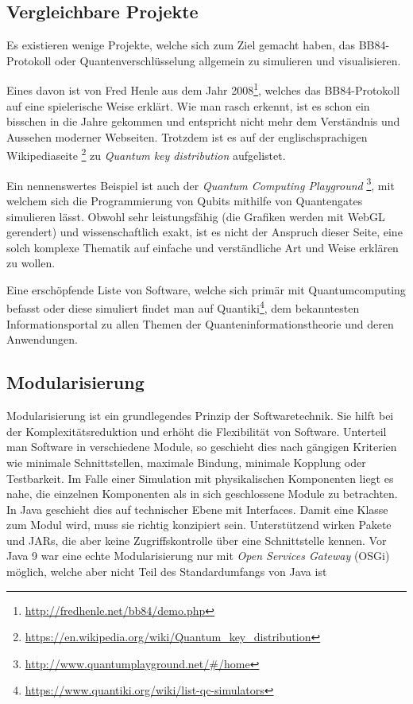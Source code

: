 \documentclass[a4paper,10.2pt,pdftex]{scrartcl}%
\begin{document}
\subsection{Vergleichbare Projekte}
Es existieren wenige Projekte, welche sich zum Ziel gemacht haben, das BB84-Protokoll oder Quantenverschlüsselung allgemein zu simulieren und visualisieren. 

Eines davon ist von Fred Henle aus dem Jahr 2008\footnote{\url{http://fredhenle.net/bb84/demo.php}}, welches das BB84-Protokoll auf eine spielerische Weise erklärt. Wie man rasch erkennt, ist es schon ein bisschen in die Jahre gekommen und entspricht nicht mehr dem Verständnis und Aussehen moderner Webseiten. Trotzdem ist es auf der englischsprachigen Wikipediaseite \footnote{\url{https://en.wikipedia.org/wiki/Quantum_key_distribution}} zu \emph{Quantum key distribution} aufgelistet.

Ein nennenswertes Beispiel ist auch der \emph{Quantum Computing Playground} \footnote{\url{http://www.quantumplayground.net/\#/home}}, mit welchem sich die Programmierung von Qubits mithilfe von Quantengates simulieren lässt. Obwohl sehr leistungsfähig (die Grafiken werden mit WebGL gerendert) und wissenschaftlich exakt, ist es nicht der Anspruch dieser Seite, eine solch komplexe Thematik auf einfache und verständliche Art und Weise erklären zu wollen.

Eine erschöpfende Liste von Software, welche sich primär mit Quantumcomputing befasst oder diese simuliert findet man auf Quantiki\footnote{\url{https://www.quantiki.org/wiki/list-qc-simulators}}, dem bekanntesten Informationsportal zu allen Themen der Quanteninformationstheorie und deren Anwendungen.

\subsection{Modularisierung}
Modularisierung ist ein grundlegendes Prinzip der Softwaretechnik. Sie hilft bei der Komplexitätsreduktion und erhöht die Flexibilität von Software. Unterteil man Software in verschiedene Module, so geschieht dies nach gängigen Kriterien wie minimale Schnittstellen, maximale Bindung, minimale Kopplung oder Testbarkeit. Im Falle einer Simulation mit physikalischen Komponenten liegt es nahe, die einzelnen Komponenten als in sich geschlossene Module zu betrachten. In Java geschieht dies auf technischer Ebene mit Interfaces. Damit eine Klasse zum Modul wird, muss sie richtig konzipiert sein. Unterstützend wirken Pakete und JARs, die aber keine Zugriffskontrolle über eine Schnittstelle kennen. Vor Java 9 war eine echte Modularisierung nur mit \emph{Open Services Gateway} (OSGi) möglich, welche aber nicht Teil des Standardumfangs von Java ist \cite[S. 32f]{modul}
\end{document}
